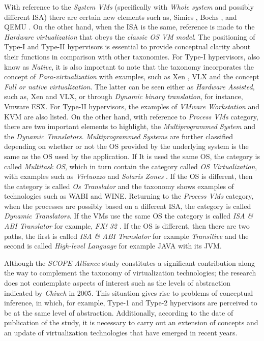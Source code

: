 	With reference to the \textit{System VMs} (specifically with \textit{Whole system} and possibly different ISA) there are certain new elements such as, Simics \cite{Magnusson2002}, Bochs \cite{Bochs2018}, and QEMU \cite {QEMU2018}. On the other hand, when the ISA is the same, reference is made to the \textit{Hardware virtualization} that obeys the \textit{classic OS VM model}. The positioning of Type-I and Type-II hypervisors is essential to provide conceptual clarity about their functions in comparison with other taxonomies. For Type-I hypervisors, also know as \textit{Native}, it is also important to note that the taxonomy incorporates the concept of \textit{Para-virtualization} with examples, such as Xen \cite{Xen2018Website, Xen2018WebsiteCambridge}, VLX \cite{Armand2009} and the concept \textit{Full or native virtualization}. The latter can be seen either as \textit{Hardware Assisted}, such as, Xen and VLX,  or through \textit{Dynamic binary translation}, for instance, Vmware ESX. For Type-II hypervisors, the examples of \textit{VMware Workstation} \cite{VMware2018Website} and KVM \cite{KVM} are also listed. On the other hand, with reference to \textit{Process VMs} category, there are two important elements to highlight,  the \textit{Multiprogrammed System} and the \textit{Dynamic Translators}. \textit{Multiprogrammed Systems} are further classified depending on whether or not the OS provided by the underlying system is the same as the OS used by the application. If It is used the same OS, the category is called \textit{Multitask OS}, which in turn contain the category called \textit{OS Virtualization}, with examples such as \textit{Virtuozzo} \cite{OpenVZ, Virtuozzo} and \textit{Solaris Zones} \cite{SolarisZones}. If the OS is different, then the category is called \textit{Os Translator} and the taxonomy shows examples of technologies such as WABI and WINE. Returning to the \textit{Process VMs} category, when the processes are possibly based on a different ISA, the category is called \textit{Dynamic Translators}. If the VMs use the same OS the category is called  \textit{ISA \& ABI Translator} for example, \textit{FX! 32} \cite{Chernoff1998}. If the OS is different, then there are two paths, the first is called \textit{ISA \& ABI Translator} for example \textit{Transitive} \cite {Transitive} and the second is called \textit{High-level Language} for example JAVA with its JVM.
	
	Although the \textit{SCOPE Alliance} study  \cite{SCOPEAlliance2008} constitutes a significant contribution along the way to complement the taxonomy of virtualization technologies; the research does not contemplate aspects of interest such as the levels of abstraction indicated by \textit{Chiueh} \cite{ Chiueh2005} in 2005. This situation gives rise to problems of conceptual inference, in which, for example, Type-1 and Type-2 hypervisors are perceived to be at the same level of abstraction. Additionally, according to the date of publication of the study, it is necessary to carry out an extension of concepts and an update of virtualization technologies that have emerged in recent years.
	